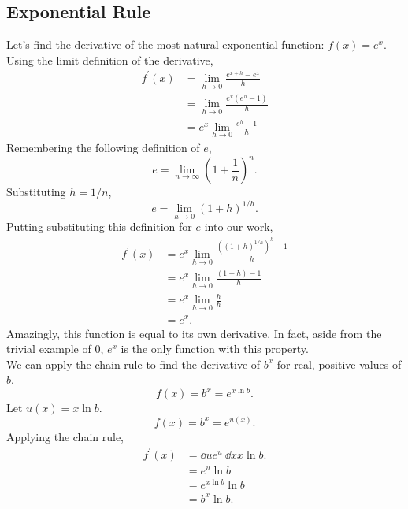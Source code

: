 \subsection{Exponential Rule}
Let's find the derivative of the most natural exponential function: $f(x) = e^x$.
Using the limit definition of the derivative,
\begin{align*}
	f^\prime(x) &= \lim_{h \to 0}{\frac{e^{x+h}-e^x}{h}} \\
	&= \lim_{h \to 0}{\frac{e^x\left(e^h - 1\right)}{h}} \\
	&= e^x \lim_{h \to 0}{\frac{e^h - 1}{h}}
\end{align*}
Remembering the following definition of $e$,
\begin{equation*}
	e = \lim_{n \to \infty}{\left(1+\frac{1}{n}\right)^n}.
\end{equation*}
Substituting $h = 1/n$,
\begin{equation*}
	e = \lim_{h \to 0}{\left(1+h\right)^{1/h}}.
\end{equation*}
Putting substituting this definition for $e$ into our work,
\begin{align*}
	f^\prime(x) &= e^x \lim_{h \to 0}{\frac{\left(\left(1+h\right)^{1/h}\right)^h-1}{h}} \\
	&= e^x \lim_{h \to 0}{\frac{\left(1+h\right)-1}{h}} \\
	&= e^x \lim_{h \to 0}{\frac{h}{h}} \\
	&= e^x.
\end{align*}
Amazingly, this function is equal to its own derivative. In fact, aside from the trivial example of $0$, $e^x$ is the only function with this property. \\


We can apply the chain rule to find the derivative of $b^x$ for real, positive values of $b$.
\begin{equation*}
	f(x) = b^x	= e^{x\ln{b}}.
\end{equation*}
Let $u(x) = x\ln{b}$.
\begin{equation*}
	f(x) = b^x = e^{u(x)}.
\end{equation*}
Applying the chain rule,
\begin{align*}
	f^\prime(x) &= \dd{}{u}e^u \hspace{3pt} \dd{}{x}x\ln{b}. \\
	&= e^u \ln{b} \\
	&= e^{x\ln{b}} \ln{b} \\
	&= b^x \ln{b}.
\end{align*}

